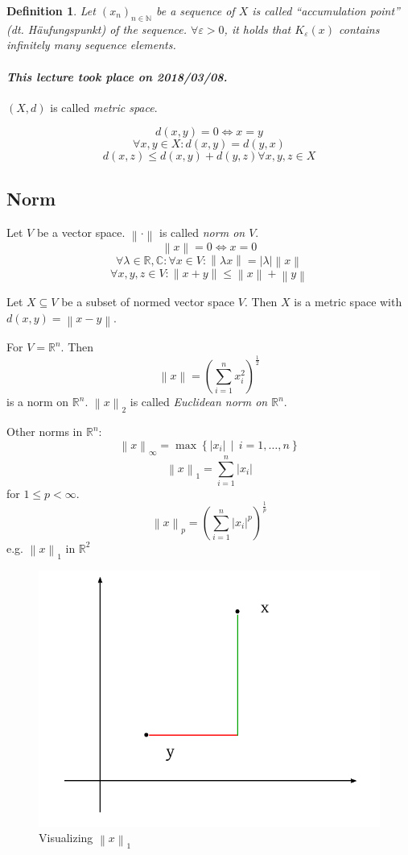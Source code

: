 \documentclass{article}
\newtheorem{definition}{Definition}  \numberwithin{definition}{section}
\newcommand{\setdef}[2]{\left\{\left.#1\,\middle|\,#2\right.\right\}}
\newcommand{\norm}[1]{\left\|#1\right\|}
\newcommand{\card}[1]{\left|#1\right|}
\newcommand{\dateref}[1]{\paragraph{\textit{This lecture took place on #1.}}}
\begin{document}
\begin{definition}
  Let $(x_n)_{n\in\mathbb N}$ be a sequence of $X$ is called \enquote{accumulation point} (\foreignlanguage{german}{dt. H\"aufungspunkt}) of the sequence.
  $\forall \varepsilon > 0$, it holds that $K_{\varepsilon}(x)$ contains infinitely many sequence elements.
\end{definition}

\dateref{2018/03/08}

$(X, d)$ is called \emph{metric space}.

\[ d(x,y) =0 \iff x = y \]
\[ \forall x,y \in X: d(x,y) = d(y,x) \]
\[ d(x,z) \leq d(x,y) + d(y,z) \forall x,y,z \in X \]

\subsection{Norm}

Let $V$ be a vector space. $\norm{\cdot}$ is called \emph{norm on $V$}.
\[ \norm{x} = 0 \iff x = 0 \]
\[ \forall \lambda \in \mathbb R, \mathbb C: \forall x \in V: \norm{\lambda x} = \card{\lambda} \norm{x} \]
\[ \forall x,y,z \in V: \norm{x + y} \leq \norm{x} + \norm{y} \]

Let $X \subseteq V$ be a subset of normed vector space $V$.
Then $X$ is a metric space with $d(x,y) = \norm{x - y}$.

For $V = \mathbb R^n$. Then
\[ \norm{x} = \left(\sum_{i=1}^n x_i^2\right)^{\frac12} \]
is a norm on $\mathbb R^n$. $\norm{x}_2$ is called \emph{Euclidean norm on $\mathbb R^n$}.

Other norms in $\mathbb R^n$:
\[ \norm{x}_{\infty} = \max\setdef{\card{x_i}}{i = 1,\dots,n} \]
\[ \norm{x}_1 = \sum_{i=1}^n \card{x_i} \]
for $1 \leq p < \infty$.
\[ \norm{x}_p = \left(\sum_{i=1}^n \card{x_i}^p\right)^{\frac1p} \]
e.g. $\norm{x}_1$ in $\mathbb R^2$

\begin{figure}[!ht]
  \begin{center}
    \includegraphics{img/02_1norm.pdf}
    \caption{Visualizing $\norm{x}_1$}
    \label{img:1norm}
  \end{center}
\end{figure}
\end{document}
